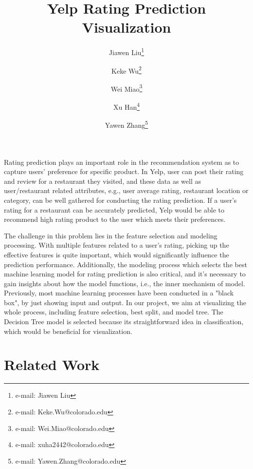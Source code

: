 \documentclass{vgtc}                          %
\title{Yelp Rating Prediction Visualization}
\author{Jiawen Liu\thanks{e-mail: Jiawen Liu}\\ %
  \and Keke Wu\thanks{e-mail: Keke.Wu@colorado.edu}\\ %
  \and Wei Miao\thanks{e-mail: Wei.Miao@colorado.edu}\\ %
  \and Xu Han\thanks{e-mail: xuha2442@colorado.edu}\\ %
  \and Yawen Zhang\thanks{e-mail: Yawen.Zhang@colorado.edu}\\ %
  }
\begin{document}


\maketitle

Rating prediction plays an important role in the recommendation system as to capture users' preference for specific product. In Yelp, user can post their rating and review for a restaurant they visited, and these data as well as user/restaurant related attributes, e.g., user average rating, restaurant location or category, can be well gathered for conducting the rating prediction. If a user's rating for a restaurant can be accurately predicted, Yelp would be able to recommend high rating product to the user which meets their preferences. 

The challenge in this problem lies in the feature selection and modeling processing. With multiple features related to a user's rating, picking up the effective features is quite important, which would significantly influence the prediction performance. Additionally, the modeling process which selects the best machine learning model for rating prediction is also critical, and it's necessary to gain insights about how the model functions, i.e., the inner mechanism of model. Previously, most machine learning processes have been conducted in a "black box", by just showing input and output. In our project, we aim at visualizing the whole process, including feature selection, best split, and model tree. The Decision Tree model is selected because its straightforward idea in classification, which would be beneficial for visualization. 

\section{Related Work}
\end{document}
